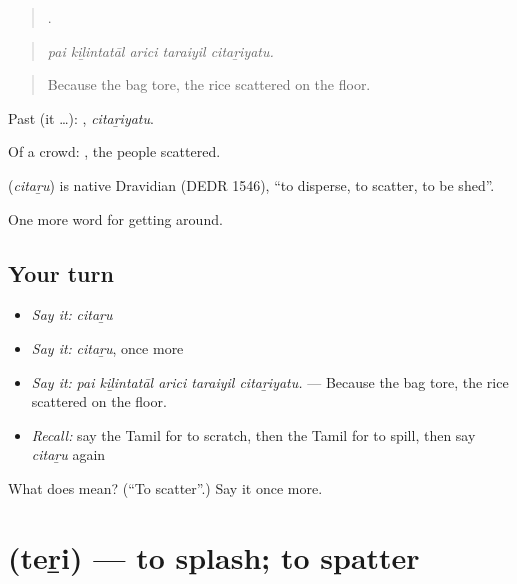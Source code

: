 \begin{quote}
    .
\end{quote}

\begin{quote}
\emph{pai kiḻintatāl arici taraiyil citaṟiyatu.}
\end{quote}

\begin{quote}
Because the bag tore, the rice scattered on the floor.
\end{quote}

Past (it …): , \emph{citaṟiyatu}.

Of a crowd:   , the people scattered.

\begin{cousinweb}
\textbf{} (\emph{citaṟu}) is native Dravidian (DEDR 1546), \textquotedblleft{}to disperse, to scatter, to be shed\textquotedblright{}.
\end{cousinweb}

\begin{grammarlens}[title={What you've built}]
One more word for getting around.
\end{grammarlens}

\subsection*{Your turn}
\begin{itemize}
\raggedright
  \item \emph{Say it:} \emph{citaṟu}
  \item \emph{Say it:} \emph{citaṟu}, once more
  \item \emph{Say it:} \emph{pai kiḻintatāl arici taraiyil citaṟiyatu.} — Because the bag tore, the rice scattered on the floor.
  \item \emph{Recall:} say the Tamil for to scratch, then the Tamil for to spill, then say \emph{citaṟu} again
\end{itemize}

\begin{tcolorbox}[breakable,colback=teal!4,colframe=teal!35!black,title={Before you move on}]
What does  mean? (\textquotedblleft{}To scatter\textquotedblright{}.) Say it once more.
\end{tcolorbox}
\section[\texorpdfstring{\ta{தெறி} (teṟi)}{தெறி (teṟi)}]{ (teṟi) — to splash; to spatter}

